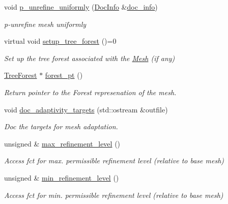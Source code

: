 \begin{DoxyCompactItemize}
void \hyperlink{classoomph_1_1TreeBasedRefineableMeshBase_a937e4097d480ed921b86ec4a7e885df6}{p\+\_\+unrefine\+\_\+uniformly} (\hyperlink{classoomph_1_1DocInfo}{Doc\+Info} \&\hyperlink{classoomph_1_1RefineableMeshBase_a266f8b2a1499cc2ae7b24b19813923ee}{doc\+\_\+info})
\begin{DoxyCompactList}\small\item\em p-\/unrefine mesh uniformly \end{DoxyCompactList}\item 
virtual void \hyperlink{classoomph_1_1TreeBasedRefineableMeshBase_aab7cbaa680b2258f2b1eea5de6bbe605}{setup\+\_\+tree\+\_\+forest} ()=0
\begin{DoxyCompactList}\small\item\em Set up the tree forest associated with the \hyperlink{classoomph_1_1Mesh}{Mesh} (if any) \end{DoxyCompactList}\item 
\hyperlink{classoomph_1_1TreeForest}{Tree\+Forest} $\ast$ \hyperlink{classoomph_1_1TreeBasedRefineableMeshBase_a3c5084830a90bf527a27271613b858a7}{forest\+\_\+pt} ()
\begin{DoxyCompactList}\small\item\em Return pointer to the Forest represenation of the mesh. \end{DoxyCompactList}\item 
void \hyperlink{classoomph_1_1TreeBasedRefineableMeshBase_a885171376e32cff058ab2fa4df6ca3c6}{doc\+\_\+adaptivity\+\_\+targets} (std\+::ostream \&outfile)
\begin{DoxyCompactList}\small\item\em Doc the targets for mesh adaptation. \end{DoxyCompactList}\item 
unsigned \& \hyperlink{classoomph_1_1TreeBasedRefineableMeshBase_a18bf22913dc5daf45fb3995d9ec30bfc}{max\+\_\+refinement\+\_\+level} ()
\begin{DoxyCompactList}\small\item\em Access fct for max. permissible refinement level (relative to base mesh) \end{DoxyCompactList}\item 
unsigned \& \hyperlink{classoomph_1_1TreeBasedRefineableMeshBase_af3974421171e1bb10daf6864f0749675}{min\+\_\+refinement\+\_\+level} ()
\begin{DoxyCompactList}\small\item\em Access fct for min. permissible refinement level (relative to base mesh) \end{DoxyCompactList}\item 

\end{DoxyCompactItemize}
